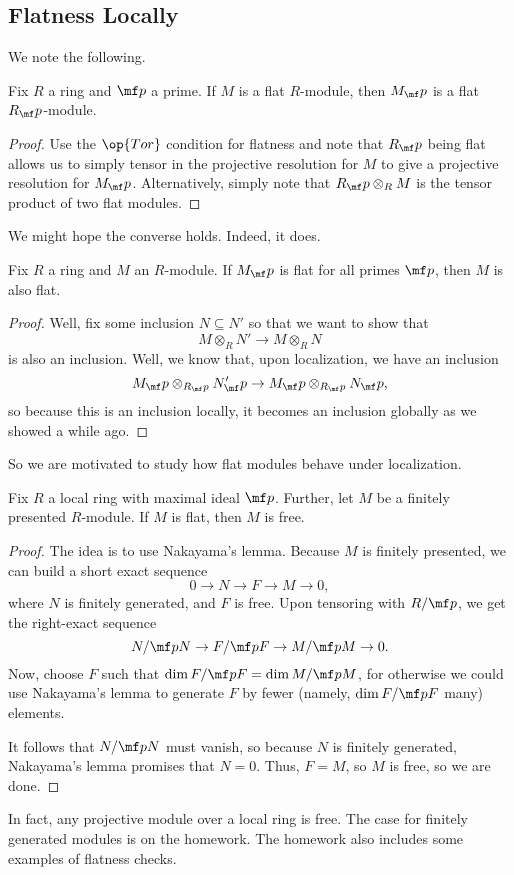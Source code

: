 \subsection{Flatness Locally}
We note the following.
\begin{lemma}
	Fix $R$ a ring and $\mf p$ a prime. If $M$ is a flat $R$-module, then $M_\mf p$ is a flat $R_\mf p$-module.
\end{lemma}
\begin{proof}
	Use the $\op{Tor}$ condition for flatness and note that $R_\mf p$ being flat allows us to simply tensor in the projective resolution for $M$ to give a projective resolution for $M_\mf p$. Alternatively, simply note that $R_\mf p\otimes_RM$ is the tensor product of two flat modules.
\end{proof}
We might hope the converse holds. Indeed, it does.
\begin{proposition}
	Fix $R$ a ring and $M$ an $R$-module. If $M_\mf p$ is flat for all primes $\mf p$, then $M$ is also flat.
\end{proposition}
\begin{proof}
	Well, fix some inclusion $N\subseteq N'$ so that we want to show that
	\[M\otimes_R N'\to M\otimes_RN\]
	is also an inclusion. Well, we know that, upon localization, we have an inclusion
	\[M_\mf p\otimes_{R_\mf p}N'_\mf p\to M_\mf p\otimes_{R_\mf p}N_\mf p,\]
	so because this is an inclusion locally, it becomes an inclusion globally as we showed a while ago.
\end{proof}
So we are motivated to study how flat modules behave under localization.
\begin{prop}
	Fix $R$ a local ring with maximal ideal $\mf p$. Further, let $M$ be a finitely presented $R$-module. If $M$ is flat, then $M$ is free.
\end{prop}
\begin{proof}
	The idea is to use Nakayama's lemma. Because $M$ is finitely presented, we can build a short exact sequence
	\[0\to N\to F\to M\to 0,\]
	where $N$ is finitely generated, and $F$ is free. Upon tensoring with $R/\mf p$, we get the right-exact sequence
	\[N/\mf pN\to F/\mf pF\to M/\mf pM\to 0.\]
	Now, choose $F$ such that $\dim F/\mf pF=\dim M/\mf pM$, for otherwise we could use Nakayama's lemma to generate $F$ by fewer (namely, $\dim F/\mf pF$ many) elements.
	
	It follows that $N/\mf pN$ must vanish, so because $N$ is finitely generated, Nakayama's lemma promises that $N=0$. Thus, $F=M$, so $M$ is free, so we are done.
\end{proof}
\begin{remark}
	In fact, any projective module over a local ring is free. The case for finitely generated modules is on the homework. The homework also includes some examples of flatness checks.
\end{remark}